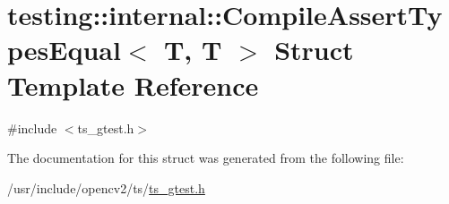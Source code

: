 \hypertarget{structtesting_1_1internal_1_1CompileAssertTypesEqual_3_01T_00_01T_01_4}{\section{testing\-:\-:internal\-:\-:Compile\-Assert\-Types\-Equal$<$ T, T $>$ Struct Template Reference}
\label{structtesting_1_1internal_1_1CompileAssertTypesEqual_3_01T_00_01T_01_4}
}


{\ttfamily \#include $<$ts\-\_\-gtest.\-h$>$}



The documentation for this struct was generated from the following file\-:\begin{DoxyCompactItemize}
\item 
/usr/include/opencv2/ts/\hyperlink{ts__gtest_8h}{ts\-\_\-gtest.\-h}\end{DoxyCompactItemize}
